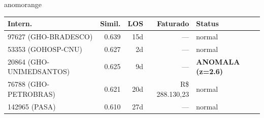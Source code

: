 \documentclass[a4paper,10pt]{article}
\begin{document}
\begin{anomalycard}[Internacao 162181 | GHO-PETROBRAS | ALTO (z=4.70)]{anomorange}
\begin{tabular}{l r r r l}\toprule\textbf{Intern.} & \textbf{Simil.} & \textbf{LOS} & \textbf{Faturado} & \textbf{Status} \\\midrule
97627 (GHO-BRADESCO) & 0.639 & 15d & --- & \textcolor{jcubeblue}{normal} \\
53353 (GOHOSP-CNU) & 0.627 & 2d & --- & \textcolor{jcubeblue}{normal} \\
20864 (GHO-UNIMEDSANTOS) & 0.625 & 9d & --- & \textcolor{anomred}{\textbf{ANOMALA (z=2.6)}} \\
76788 (GHO-PETROBRAS) & 0.621 & 20d & R\$ 288.130,23 & \textcolor{jcubeblue}{normal} \\
142965 (PASA) & 0.610 & 27d & --- & \textcolor{jcubeblue}{normal} \\
\bottomrule\end{tabular}



\end{anomalycard}

\newpage
\end{document}
